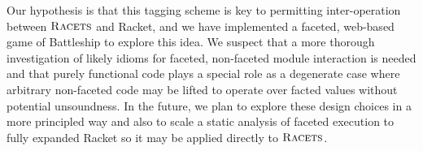 \documentclass[review=true,acmlarge]{acmart}
\newcommand{\racets}[0]{$\textsc{Racets}$\xspace}
\begin{document}
Our hypothesis is that this tagging scheme is key to permitting inter-operation
between \racets and Racket, and we have implemented a faceted, web-based game of Battleship
to explore this idea. We suspect that a more thorough investigation of likely idioms
for faceted, non-faceted module interaction is needed and that purely functional code
plays a special role as a degenerate case where arbitrary non-faceted code may be lifted
to operate over facted values without potential unsoundness. In the future, we plan to explore
these design choices in a more principled way and also to scale a static analysis of faceted
execution to fully expanded Racket so it may be applied directly to \racets.





\end{document}
